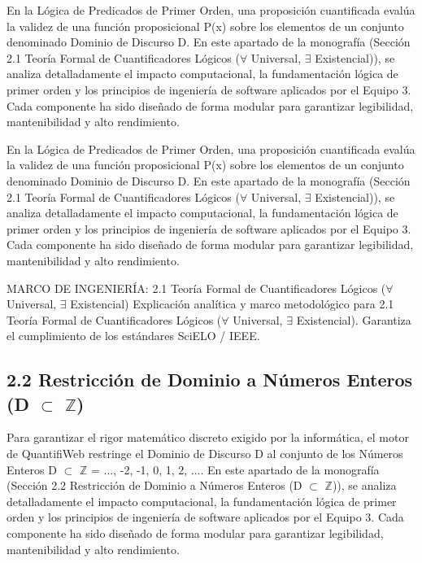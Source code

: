 \documentclass[11pt,a4paper]{article}
\begin{document}
En la Lógica de Predicados de Primer Orden, una proposición cuantificada
evalúa la validez de una función proposicional P(x) sobre los elementos
de un conjunto denominado Dominio de Discurso D. En este apartado de la
monografía (Sección 2.1 Teoría Formal de Cuantificadores Lógicos ($ \forall $
Universal, $ \exists $ Existencial)), se analiza detalladamente el impacto
computacional, la fundamentación lógica de primer orden y los principios
de ingeniería de software aplicados por el Equipo 3. Cada componente ha
sido diseñado de forma modular para garantizar legibilidad,
mantenibilidad y alto rendimiento.

En la Lógica de Predicados de Primer Orden, una proposición cuantificada
evalúa la validez de una función proposicional P(x) sobre los elementos
de un conjunto denominado Dominio de Discurso D. En este apartado de la
monografía (Sección 2.1 Teoría Formal de Cuantificadores Lógicos ($ \forall $
Universal, $ \exists $ Existencial)), se analiza detalladamente el impacto
computacional, la fundamentación lógica de primer orden y los principios
de ingeniería de software aplicados por el Equipo 3. Cada componente ha
sido diseñado de forma modular para garantizar legibilidad,
mantenibilidad y alto rendimiento.

\medskip\hrulefill\medskip
 MARCO DE INGENIERÍA: 2.1 Teoría Formal de Cuantificadores Lógicos ($ \forall $
Universal, $ \exists $ Existencial)
Explicación analítica y marco metodológico para 2.1 Teoría Formal de
Cuantificadores Lógicos ($ \forall $ Universal, $ \exists $ Existencial). Garantiza el
cumplimiento de los estándares SciELO / IEEE.
\medskip\hrulefill\medskip

\medskip\hrulefill\medskip

\subsection{2.2 Restricción de Dominio a Números Enteros (D $ \subset $ $\mathbb{Z}$)}

Para garantizar el rigor matemático discreto exigido por la informática,
el motor de QuantifiWeb restringe el Dominio de Discurso D al conjunto
de los Números Enteros D $ \subset $ $\mathbb{Z}$ = {..., -2, -1, 0, 1, 2, ...}. En este
apartado de la monografía (Sección 2.2 Restricción de Dominio a Números
Enteros (D $ \subset $ $\mathbb{Z}$)), se analiza detalladamente el impacto computacional, la
fundamentación lógica de primer orden y los principios de ingeniería de
software aplicados por el Equipo 3. Cada componente ha sido diseñado de
forma modular para garantizar legibilidad, mantenibilidad y alto
rendimiento.
\end{document}

